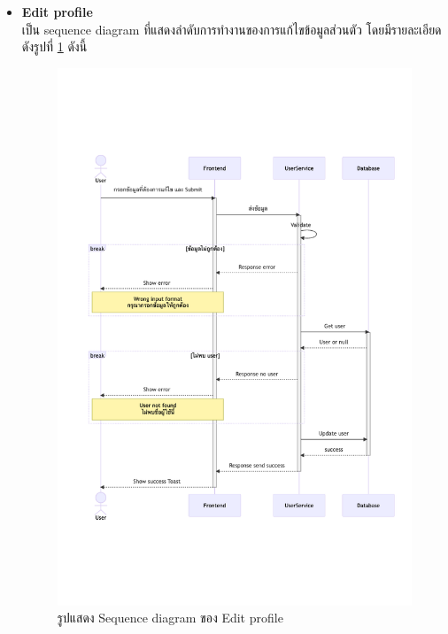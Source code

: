 \documentclass[12pt,oneside,openright,a4paper]{cpe-thai-project}
\begin{document}
\begin{itemize}
    \newpage
    \item \textbf{Edit profile} \\
    เป็น sequence diagram ที่แสดงลำดับการทำงานของการแก้ไขข้อมูลส่วนตัว โดยมีรายละเอียดดังรูปที่ \ref{fig:sqEditProfile} ดังนี้
    \begin{figure}[!ht]\centering
        \includegraphics[width=15cm, trim={0 6cm 0 6cm},clip]{./assets/sequence-diagram/edit-profile.png}
        \caption{รูปแสดง Sequence diagram ของ Edit profile}\label{fig:sqEditProfile}
    \end{figure}


\end{itemize}
\end{document}
